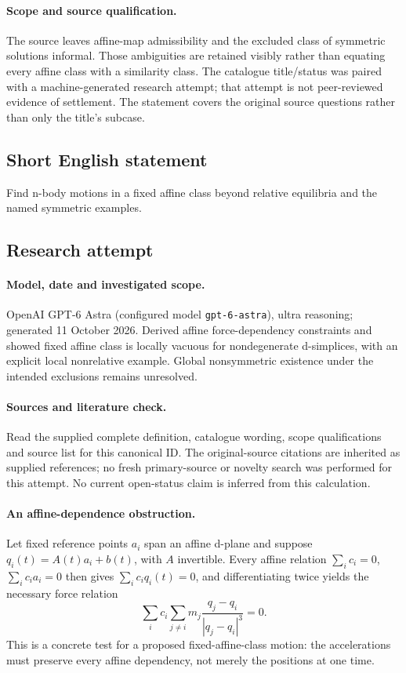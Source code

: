 \documentclass[11pt]{article}
\begin{document}
\paragraph{Scope and source qualification.}The source leaves affine-map admissibility and the excluded class of symmetric solutions informal. Those ambiguities are retained visibly rather than equating every affine class with a similarity class. The catalogue title/status was paired with a machine-generated research attempt; that attempt is not peer-reviewed evidence of settlement. The statement covers the original source questions rather than only the title’s subcase.
\subsection{Short English statement}
Find n-body motions in a fixed affine class beyond relative equilibria and the named symmetric examples.
\subsection{Research attempt}
\paragraph{Model, date and investigated scope.}
OpenAI GPT-6 Astra (configured model \texttt{gpt-6-astra}), ultra reasoning; generated 11 October 2026. Derived affine force-dependency constraints and showed fixed affine class is locally vacuous for nondegenerate d-simplices, with an explicit local nonrelative example. Global nonsymmetric existence under the intended exclusions remains unresolved.

\paragraph{Sources and literature check.}
Read the supplied complete definition, catalogue wording, scope qualifications and source list for this canonical ID. The original-source citations are inherited as supplied references; no fresh primary-source or novelty search was performed for this attempt. No current open-status claim is inferred from this calculation.

\paragraph{An affine-dependence obstruction.}Let fixed reference points \(a_i\) span an affine d-plane and suppose \(q_i(t)=A(t)a_i+b(t)\), with \(A\) invertible. Every affine relation \(\sum_ic_i=0\), \(\sum_ic_ia_i=0\) then gives \(\sum_ic_iq_i(t)=0\), and differentiating twice yields the necessary force relation
\[\sum_i c_i\sum_{j\ne i}m_j\frac{q_j-q_i}{|q_j-q_i|^3}=0.
\]
This is a concrete test for a proposed fixed-affine-class motion: the accelerations must preserve every affine dependency, not merely the positions at one time.
\end{document}
